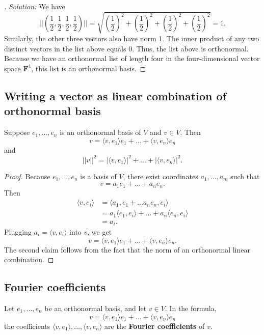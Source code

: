 \documentclass[11pt]{article}
\begin{document}
    \begin{proof}[\unskip\nopunct]
        \emph{Solution:} We have \[\bigg| \bigg| \left(\frac{1}{2}, \frac{1}{2}, \frac{1}{2}, \frac{1}{2} \right) \bigg| \bigg| = \sqrt{\left(\frac{1}{2}\right)^2 + \left(\frac{1}{2}\right)^2 + \left(\frac{1}{2}\right)^2 + \left(\frac{1}{2}\right)^2} = 1.\] Similarly, the other three vectors also have norm 1. The inner product of any two distinct vectors in the list above equals 0. Thus, the list above is orthonormal. Because we have an orthonormal list of length four in the four-dimensional vector space \(\textbf{F}^4\), this list is an orthonormal basis. 
    \end{proof}

    \subsection{Writing a vector as linear combination of orthonormal basis}

    Suppose \(e_1, \dots, e_n\) is an orthonormal basis of $V$ and \(v \in V\). Then \[v = \langle v, e_1 \rangle e_1 + \dots + \langle v, e_n \rangle e_n\] and \[||v||^2 = |\langle v, e_1 \rangle|^2 + \dots + |\langle v, e_n \rangle |^2. \]

    \begin{proof}
        Because \(e_1, \dots, e_n\) is a basis of $V$, there exist coordinates \(a_1, \dots, a_m\) such that \[v = a_1 e_1 + \dots + a_n e_n.\] Then 
        \begin{align*}
            \langle v, e_i \rangle &= \langle a_1, e_1 + \dots a_n e_n, e_i \rangle \\
                                   &= a_1 \langle e_1, e_i \rangle + \dots + a_n \langle e_n, e_i \rangle \\
                                   &= a_i.
        \end{align*}
        Plugging \(a_i = \langle v, e_i \rangle\) into $v$, we get \[v = \langle v,e_1 \rangle e_1 + \dots + \langle v,e_n \rangle e_n.\] The second claim follows from the fact that the norm of an orthonormal linear combination. 
    \end{proof}

    \subsection{Fourier coefficients}

    Let \(e_1, \dots, e_n\) be an orthonormal basis, and let \(v \in V\). In the formula, \[v = \langle v, e_1 \rangle e_1 + \dots + \langle v, e_n \rangle e_n\] the coefficients \(\langle v, e_1 \rangle, \dots, \langle v, e_n \rangle\) are the \textbf{Fourier coefficients} of $v$. 
\end{document}

